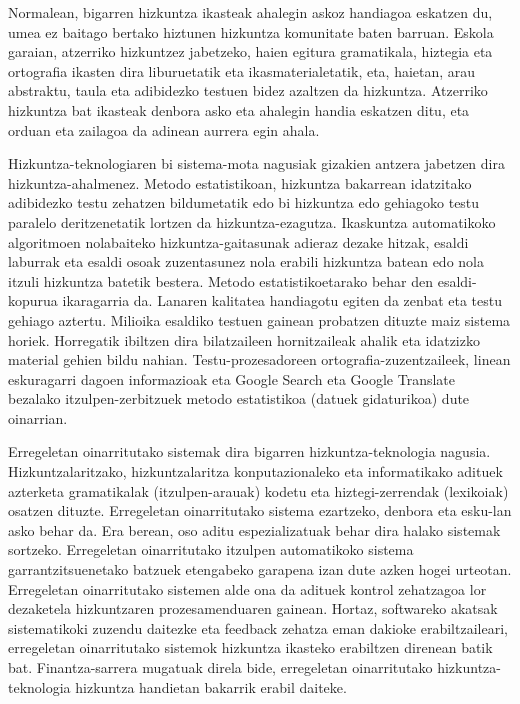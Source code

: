 \begin{multicols}{2}
Normalean, bigarren hizkuntza ikasteak ahalegin askoz handiagoa eskatzen du, umea ez baitago bertako hiztunen hizkuntza komunitate baten barruan. Eskola garaian, atzerriko hizkuntzez jabetzeko, haien egitura gramatikala, hiztegia eta ortografia ikasten dira liburuetatik eta ikasmaterialetatik, eta, haietan, arau abstraktu, taula eta adibidezko testuen bidez azaltzen da hizkuntza. Atzerriko hizkuntza bat ikasteak denbora asko eta ahalegin handia eskatzen ditu, eta orduan eta zailagoa da adinean aurrera egin ahala.
 
 
Hizkuntza-teknologiaren bi sistema-mota nagusiak gizakien antzera jabetzen dira hizkuntza-ahalmenez. Metodo estatistikoan, hizkuntza bakarrean idatzitako adibidezko testu zehatzen bildumetatik edo bi hizkuntza edo gehiagoko testu paralelo deritzenetatik lortzen da hizkuntza-ezagutza. Ikaskuntza automatikoko algoritmoen nolabaiteko hizkuntza-gaitasunak adieraz dezake hitzak, esaldi laburrak eta esaldi osoak zuzentasunez nola erabili hizkuntza batean edo nola itzuli hizkuntza batetik bestera. Metodo estatistikoetarako behar den esaldi-kopurua ikaragarria da. Lanaren kalitatea handiagotu egiten da zenbat eta testu gehiago aztertu. Milioika esaldiko testuen gainean probatzen dituzte maiz sistema horiek. Horregatik ibiltzen dira bilatzaileen hornitzaileak ahalik eta idatzizko material gehien bildu nahian. Testu-prozesadoreen ortografia-zuzentzaileek, linean eskuragarri dagoen informazioak eta Google Search eta Google Translate bezalako itzulpen-zerbitzuek metodo estatistikoa (datuek gidaturikoa) dute oinarrian. 

Erregeletan oinarritutako sistemak dira bigarren hizkuntza-teknologia nagusia. Hizkuntzalaritzako, hizkuntzalaritza konputazionaleko eta informatikako adituek azterketa gramatikalak (itzulpen-arauak) kodetu eta hiztegi-zerrendak (lexikoiak) osatzen dituzte. Erregeletan oinarritutako sistema ezartzeko, denbora eta esku-lan asko behar da. Era berean, oso aditu espezializatuak behar dira halako sistemak sortzeko. Erregeletan oinarritutako itzulpen automatikoko sistema garrantzitsuenetako batzuek etengabeko garapena izan dute azken hogei urteotan. Erregeletan oinarritutako sistemen alde ona da adituek kontrol zehatzagoa lor dezaketela hizkuntzaren prozesamenduaren gainean. Hortaz, softwareko akatsak sistematikoki zuzendu daitezke eta feedback zehatza eman dakioke erabiltzaileari, erregeletan oinarritutako sistemok hizkuntza ikasteko erabiltzen direnean batik bat. Finantza-sarrera mugatuak direla bide, erregeletan oinarritutako hizkuntza-teknologia hizkuntza handietan bakarrik erabil daiteke. 


\end{multicols}
